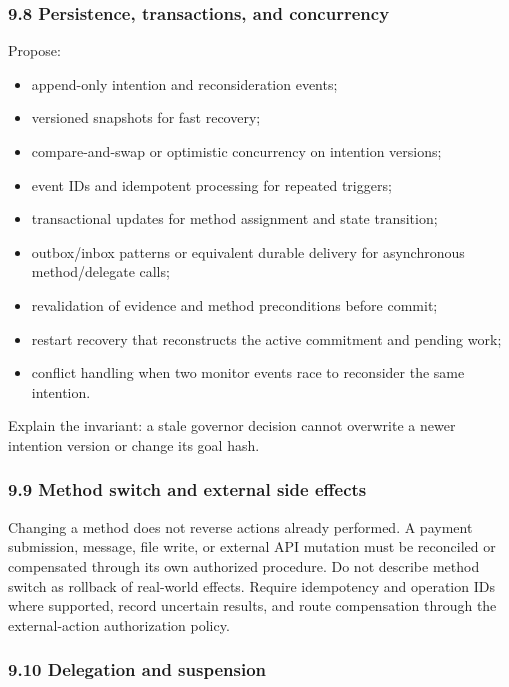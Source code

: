 \subsubsection{9.8 Persistence, transactions, and concurrency}\label{persistence-transactions-and-concurrency}

Propose:

\begin{itemize}
\tightlist
\item
  append-only intention and reconsideration events;
\item
  versioned snapshots for fast recovery;
\item
  compare-and-swap or optimistic concurrency on intention versions;
\item
  event IDs and idempotent processing for repeated triggers;
\item
  transactional updates for method assignment and state transition;
\item
  outbox/inbox patterns or equivalent durable delivery for asynchronous method/delegate calls;
\item
  revalidation of evidence and method preconditions before commit;
\item
  restart recovery that reconstructs the active commitment and pending work;
\item
  conflict handling when two monitor events race to reconsider the same intention.
\end{itemize}

Explain the invariant: a stale governor decision cannot overwrite a newer intention version or change its goal hash.

\subsubsection{9.9 Method switch and external side effects}\label{method-switch-and-external-side-effects}

Changing a method does not reverse actions already performed. A payment submission, message, file write, or external API mutation must be reconciled or compensated through its own authorized procedure. Do not describe method switch as rollback of real-world effects. Require idempotency and operation IDs where supported, record uncertain results, and route compensation through the external-action authorization policy.

\subsubsection{9.10 Delegation and suspension}\label{delegation-and-suspension}

